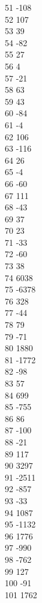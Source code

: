 { 51	-108 \\
 52	107 \\
 53	39 \\
 54	-82 \\
 55	27 \\
 56	4 \\
 57	-21 \\
 58	63 \\
 59	43 \\
 60	-84 \\
 61	-4 \\
 62	106 \\
 63	-116 \\
 64	26 \\
 65	-4 \\
 66	-60 \\
 67	111 \\
 68	-43 \\
 69	37 \\
 70	23 \\
 71	-33 \\
 72	-60 \\
 73	38 \\
 74	6038 \\
 75	-6378 \\
 76	328 \\
 77	-44 \\
 78	79 \\
 79	-71 \\
 80	1880 \\
 81	-1772 \\
 82	-98 \\
 83	57 \\
 84	699 \\
 85	-755 \\
 86	86 \\
 87	-100 \\
 88	-21 \\
 89	117 \\
 90	3297 \\
 91	-2511 \\
 92	-857 \\
 93	-33 \\
 94	1087 \\
 95	-1132 \\
 96	1776 \\
 97	-990 \\
 98	-762 \\
 99	127 \\
 100	-91 \\
 101	1762 \\
}
